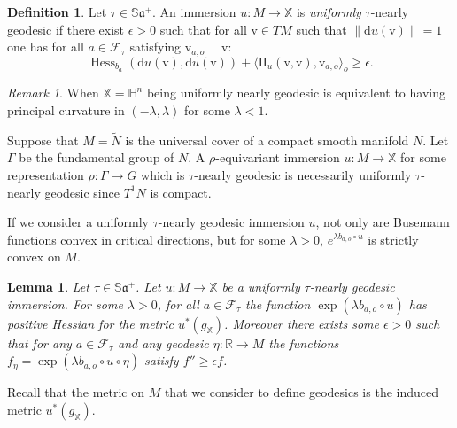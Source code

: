 \documentclass[reqno,10pt]{amsart}
\theoremstyle{plain}
\newtheorem{lem}[thm]{Lemma}
\theoremstyle{definition}
\newtheorem{defn}[thm]{Definition}
\theoremstyle{remark}
\newtheorem{rem}[thm]{Remark}
\newcommand{\type}{\tau}
\newcommand{\R}{\mathbb{R}}
\newcommand{\Sph}{\mathbb{S}}
\DeclareMathOperator{\Hess}{Hess}
\newcommand{\II}{\mathrm{I\!I}}
\newcommand{\X}{\mathbb{X}}
\begin{document}
\begin{defn}
\label{defn:UniformlyNearlyGeod}
Let $\type\in \Sph\mathfrak{a}^+$. An immersion $u:M\to \X$ is \emph{uniformly} $\type$-nearly geodesic if there exist $\epsilon>0$ such that for all $\mathrm{v}\in TM$ such that $\lVert\mathrm{d}u(\mathrm{v})\rVert=1$ one has for all $a\in \mathcal{F}_\type$ satisfying $\mathrm{v}_{a,o}\perp\mathrm{v}$:
$$\Hess_{b_a}(\mathrm{d}u(\mathrm{v}),\mathrm{d}u(\mathrm{v}))+\langle\II_u(\mathrm{v},\mathrm{v}),\mathrm{v}_{a,o}\rangle_o\geq\epsilon.$$
\end{defn}

\begin{rem}
When $\X=\mathbb{H}^n$ being uniformly nearly geodesic is equivalent to having principal curvature in $(-\lambda,\lambda)$ for some $\lambda<1$.
\end{rem}

Suppose that $M=\widetilde{N}$ is the universal cover of a compact smooth manifold $N$.  Let $\Gamma$ be the fundamental group of $N$. A $\rho$-equivariant immersion $u:M\to \X$ for some representation $\rho:\Gamma\to G$ which is $\type$-nearly geodesic is necessarily uniformly $\type$-nearly geodesic since $T^1N$ is compact.

\medskip

If we consider a uniformly $\type$-nearly geodesic immersion $u$, not only are Busemann functions convex in critical directions, but for some $\lambda>0$, $e^{\lambda b_{a,o}\circ u}$ is strictly convex on $M$.

\begin{lem}
\label{lem:nearlyGeodConvex}
Let $\type\in \Sph\mathfrak{a}^+$. Let $u:M\to \X$ be a uniformly $\type$-nearly geodesic immersion. For some $\lambda>0$, for all $a\in\mathcal{F}_\type$ the function $\exp\left(\lambda b_{a,o}\circ u\right)$ has positive Hessian for the metric $u^*(g_\X)$.
Moreover there exists some $\epsilon>0$ such that for any $a\in \mathcal{F}_\type$ and any geodesic $\eta:\R\to M$ the functions $f_\eta=\exp\left(\lambda b_{a,o}\circ u\circ \eta\right)$ satisfy $f''\geq\epsilon f$.
\end{lem}

Recall that the metric on $M$ that we consider to define geodesics is the induced metric $u^*(g_\X)$.

\medskip
\end{document}
